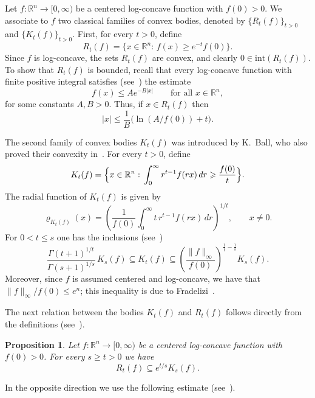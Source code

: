 \documentclass[11pt,leqno]{article}
\newtheorem{proposition}[theorem]{Proposition}
\theoremstyle{definition}
\theoremstyle{remark}
\numberwithin{equation}{section}
\newcommand{\ls}{\leqslant}
\newcommand{\gr}{\geqslant}
\begin{document}
Let $f:\mathbb{R}^n \to [0,\infty)$ be a centered log-concave function with $f(0)>0$.  
We associate to $f$ two classical families of convex bodies, denoted by $\{R_t(f)\}_{t>0}$ and
$\{K_t(f)\}_{t>0}$. First, for every $t>0$, define
$$R_t(f)=\{x\in\mathbb{R}^n:\, f(x)\gr e^{-t}f(0)\}.$$
Since $f$ is log-concave, the sets $R_t(f)$ are convex, and clearly $0\in\mathrm{int}(R_t(f))$.
To show that $R_t(f)$ is bounded, recall that every log-concave function with finite positive
integral satisfies (see~\cite[Lemma~2.2.1]{BGVV-book}) the estimate
\begin{equation}\label{eq:A-B}
f(x)\ls A e^{-B|x|}
\qquad\text{for all } x\in\mathbb{R}^n,
\end{equation}
for some constants $A,B>0$.  
Thus, if $x\in R_t(f)$ then
$$|x|\ls \frac{1}{B}\bigl(\ln(A/f(0))+t\bigr).$$

The second family of convex bodies $K_t(f)$ was introduced by K.~Ball, who also proved their convexity
in~\cite{Ball-1988}. For every $t>0$, define
$$K_t(f)=\Bigl\{x\in\mathbb{R}^n:\, \int_0^\infty r^{t-1}f(rx)\,dr \gr \frac{f(0)}{t} \Bigr\}.$$
The radial function of $K_t(f)$ is given by
\begin{equation}\label{eq:radial-Kp}
\varrho_{K_t(f)}(x)=\left( \frac{1}{f(0)}\int_{0}^{\infty} t\, r^{t-1} f(rx)\,dr \right)^{1/t},\qquad x\neq 0.
\end{equation}
For $0<t\ls s$ one has the inclusions (see~\cite[Proposition~2.5.7]{BGVV-book})
\begin{equation}\label{eq:inclusions-Kp}
\frac{\Gamma(t+1)^{1/t}}{\Gamma(s+1)^{1/s}}\,K_s(f)\subseteq K_t(f)\subseteq
\left(\frac{\|f\|_{\infty}}{f(0)}\right)^{\frac{1}{t}-\frac{1}{s}} K_s(f).
\end{equation}
Moreover, since $f$ is assumed centered and log-concave, we have that
$\|f\|_{\infty}/f(0)\ls e^n$; this inequality is due to Fradelizi~\cite{Fradelizi-1997}.

The next relation between the bodies $K_t(f)$ and $R_t(f)$ follows directly from the definitions
(see~\cite[Proposition~2.3]{Giannopoulos-Tziotziou-2025}).

\begin{proposition}\label{prop:r-3}
Let $f:\mathbb{R}^n \to [0,\infty)$ be a centered log-concave function with $f(0)>0$.  For every $s\gr t>0$ we have
$$R_t(f)\subseteq e^{t/s} K_s(f).$$
\end{proposition}

In the opposite direction we use the following estimate
(see~\cite[Proposition~2.4]{Giannopoulos-Tziotziou-2025}).
\end{document}
